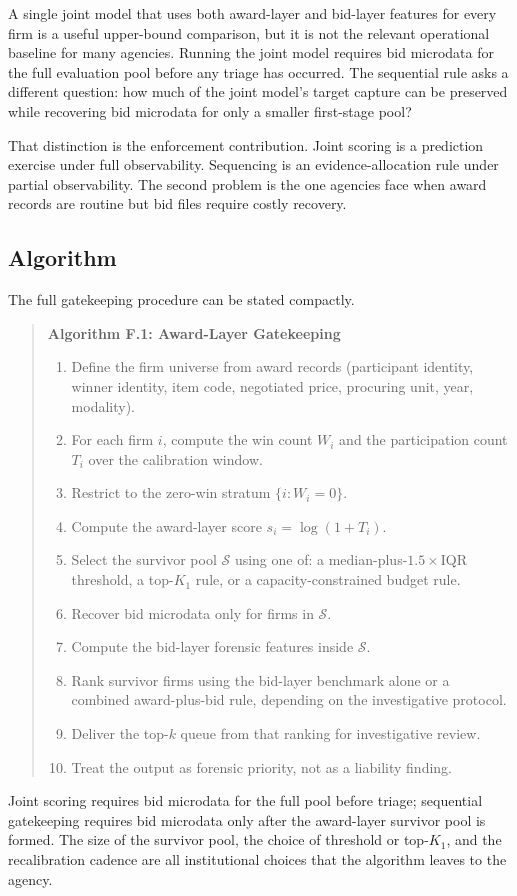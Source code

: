 A single joint model that uses both award-layer and bid-layer
features for every firm is a useful upper-bound comparison, but
it is not the relevant operational baseline for many agencies.
Running the joint model requires bid microdata for the full
evaluation pool before any triage has occurred. The sequential
rule asks a different question: how much of the joint model's
target capture can be preserved while recovering bid microdata
for only a smaller first-stage pool?

That distinction is the enforcement contribution. Joint scoring
is a prediction exercise under full observability. Sequencing is
an evidence-allocation rule under partial observability. The
second problem is the one agencies face when award records are
routine but bid files require costly recovery.

\subsection{Algorithm}
\label{app:gatekeeping_algorithm_v18}

The full gatekeeping procedure can be stated compactly.

\begin{quote}
\textbf{Algorithm F.1: Award-Layer Gatekeeping}
\begin{enumerate}
\item Define the firm universe from award records (participant
identity, winner identity, item code, negotiated price,
procuring unit, year, modality).
\item For each firm $i$, compute the win count $W_i$ and the
participation count $T_i$ over the calibration window.
\item Restrict to the zero-win stratum $\{i : W_i = 0\}$.
\item Compute the award-layer score $s_i = \log(1+T_i)$.
\item Select the survivor pool $\mathcal{S}$ using one of: a
median-plus-$1.5\times$IQR threshold, a top-$K_1$ rule, or a
capacity-constrained budget rule.
\item Recover bid microdata only for firms in $\mathcal{S}$.
\item Compute the bid-layer forensic features inside
$\mathcal{S}$.
\item Rank survivor firms using the bid-layer benchmark alone
or a combined award-plus-bid rule, depending on the
investigative protocol.
\item Deliver the top-$k$ queue from that ranking for
investigative review.
\item Treat the output as forensic priority, not as a liability
finding.
\end{enumerate}
\end{quote}

Joint scoring requires bid microdata for the full pool before
triage; sequential gatekeeping requires bid microdata only
after the award-layer survivor pool is formed. The size of the
survivor pool, the choice of threshold or top-$K_1$, and the
recalibration cadence are all institutional choices that the
algorithm leaves to the agency.

